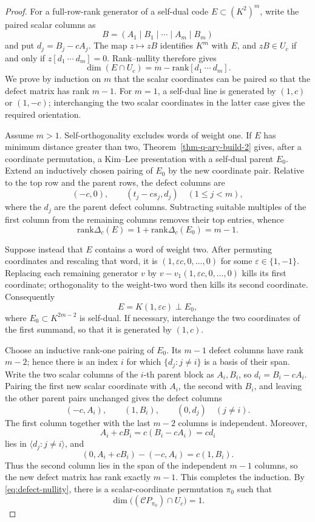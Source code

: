\documentclass[12pt]{article}
\newcommand{\rank}{\mathrm{rank}}
\begin{document}
\begin{proof}
For a full-row-rank generator of a self-dual code
\(E\subset(K^2)^m\), write the paired scalar columns as
\[
B=(A_1\mid B_1\mid\cdots\mid A_m\mid B_m)
\]
and put \(d_j=B_j-cA_j\).  The map \(z\mapsto zB\) identifies \(K^m\)
with \(E\), and \(zB\in U_c\) if and only if
\(z[d_1\ \cdots\ d_m]=0\).  Rank--nullity therefore gives
\begin{equation}
\dim(E\cap U_c)=m-\rank[d_1\ \cdots\ d_m].
\label{eq:defect-nullity}
\end{equation}
We prove by induction on \(m\) that the scalar coordinates can be paired so
that the defect matrix has rank \(m-1\).  For \(m=1\), a self-dual line is
generated by \((1,c)\) or \((1,-c)\); interchanging the two scalar coordinates
in the latter case gives the required orientation.

Assume \(m>1\).  Self-orthogonality excludes words of weight one.  If \(E\)
has minimum distance greater than two,
Theorem~\ref{thm-q-ary-build-2} gives, after a coordinate permutation, a
Kim--Lee presentation with a self-dual parent \(E_0\).  Extend an inductively
chosen pairing of \(E_0\) by the new coordinate pair.  Relative to the top
row and the parent rows, the defect columns are
\[
(-c,0),\qquad (t_j-cs_j,d_j)\quad(1\le j<m),
\]
where the \(d_j\) are the parent defect columns.  Subtracting suitable
multiples of the first column from the remaining columns removes their top
entries, whence
\[
\rank\Delta_c(E)=1+\rank\Delta_c(E_0)=m-1.
\]

Suppose instead that \(E\) contains a word of weight two.  After permuting
coordinates and rescaling that word, it is \((1,\varepsilon c,0,\ldots,0)\)
for some \(\varepsilon\in\{1,-1\}\).  Replacing each remaining generator
\(v\) by \(v-v_1(1,\varepsilon c,0,\ldots,0)\) kills its first coordinate;
orthogonality to the weight-two word then kills its second coordinate.
Consequently
\[
E=K(1,\varepsilon c)\perp E_0,
\]
where \(E_0\subset K^{2m-2}\) is self-dual.  If necessary, interchange the
two coordinates of the first summand, so that it is generated by \((1,c)\).

Choose an inductive rank-one pairing of \(E_0\).  Its \(m-1\) defect
columns have rank \(m-2\); hence there is an index \(i\) for which
\(\{d_j:j\ne i\}\) is a basis of their span.  Write the two scalar columns
of the \(i\)-th parent block as \(A_i,B_i\), so
\(d_i=B_i-cA_i\).  Pairing the first new scalar coordinate with \(A_i\),
the second with \(B_i\), and leaving the other parent pairs unchanged gives
the defect columns
\[
(-c,A_i),\qquad(1,B_i),\qquad(0,d_j)\quad(j\ne i).
\]
The first column together with the last \(m-2\) columns is independent.
Moreover,
\[
A_i+cB_i=c(B_i-cA_i)=cd_i
\]
lies in \(\langle d_j:j\ne i\rangle\), and
\[
(0,A_i+cB_i)-(-c,A_i)=c(1,B_i).
\]
Thus the second column lies in the span of the independent \(m-1\) columns,
so the new defect matrix has rank exactly \(m-1\).  This completes the
induction.  By \eqref{eq:defect-nullity}, there is a scalar-coordinate
permutation \(\pi_0\) such that
\[
\dim\bigl((\mathcal C P_{\pi_0})\cap U_c\bigr)=1.
\]


\end{proof}
\end{document}
